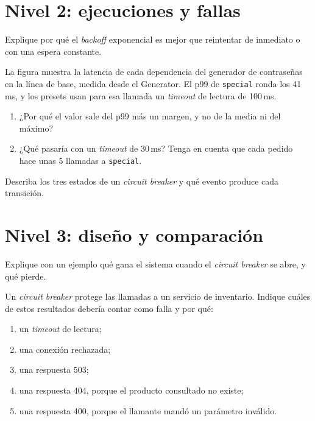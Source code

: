\documentclass[variant=guia,cover=institutional,mode=screen]{ua-engineering-v6-article}
\begin{document}
\section{Nivel 2: ejecuciones y fallas}

\begin{uaexercise}
Explique por qué el \emph{backoff} exponencial es mejor que reintentar de inmediato o con una espera constante.
\end{uaexercise}

\begin{uaexercise}
La figura muestra la latencia de cada dependencia del generador de contraseñas en la línea de base, medida desde el Generator. El p99 de \texttt{special} ronda los 41\,ms, y los presets usan para esa llamada un \emph{timeout} de lectura de 100\,ms.
\begin{enumerate}
\item ¿Por qué el valor sale del p99 más un margen, y no de la media ni del máximo?
\item ¿Qué pasaría con un \emph{timeout} de 30\,ms? Tenga en cuenta que cada pedido hace unas 5 llamadas a \texttt{special}.
\end{enumerate}
\end{uaexercise}

\begin{uaexercise}
Describa los tres estados de un \emph{circuit breaker} y qué evento produce cada transición.
\end{uaexercise}


\section{Nivel 3: diseño y comparación}
\begin{uaexercise}
Explique con un ejemplo qué gana el sistema cuando el \emph{circuit breaker} se abre, y qué pierde.
\end{uaexercise}

\begin{uaexercise}
Un \emph{circuit breaker} protege las llamadas a un servicio de inventario. Indique cuáles de estos resultados debería contar como falla y por qué:
\begin{enumerate}
\item un \emph{timeout} de lectura;
\item una conexión rechazada;
\item una respuesta 503;
\item una respuesta 404, porque el producto consultado no existe;
\item una respuesta 400, porque el llamante mandó un parámetro inválido.
\end{enumerate}
\end{uaexercise}
\end{document}

